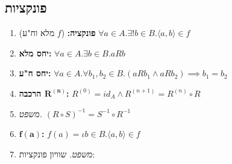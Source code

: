 \documentclass[]{article}
\newcommand\ra    {\rangle}
\newcommand\la    {\langle}
\newcommand\op    {^{-1}}
\newcommand\tho       {\textit{משפט. }}
\begin{document}
\begin{multicols}{2}
			\subsection{פונקציות}
		\begin{enumerate}[resume]
			\item \textbf{פונקציה: }\hfill ($f$ מלא וח"ע) $\forall a \in A. \exists! b \in B. \la a, b \ra \in f$
			\item \textbf{יחס מלא: }\hfill $\forall a \in A. \exists b \in B. aRb$
			\item \textbf{יחס ח"ע: }\hfill $\forall a \in A. \forall b_1, b_2 \in B. (aRb_1 \land aRb_2) \implies b_1 = b_2$
			\item \textbf{הרכבה $\bm{R^{(n)}}$: }\hfill $R^{(0)} = id_A \land R^{(n + 1)} = R^{(n)} \circ R$
			\item \tho \hfill $(R \circ S)\op = S \op \circ R \op$
			\item \textbf{$\bm{f(a)}$: }\hfill $f(a) = \iota b \in B. \la a, b \ra \in f$
			\item \tho שוויון פונקציות: 
				

\end{enumerate}
\end{multicols}
\end{document}
